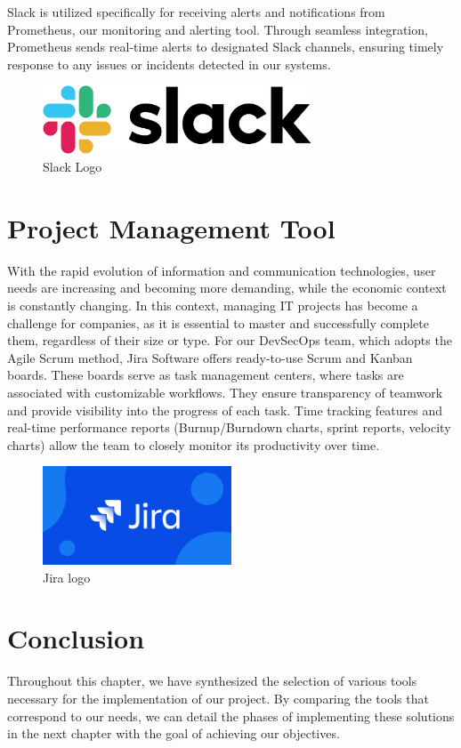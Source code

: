 Slack is utilized specifically for receiving alerts and notifications from Prometheus, our monitoring and alerting tool. Through seamless integration, Prometheus sends real-time alerts to designated Slack channels, ensuring timely response to any issues or incidents detected in our systems.
\begin{figure}[H]
\centering
\includegraphics[width=8cm]{Logos/slack_logo.png}
\caption{Slack Logo}
\end{figure}


\section{Project Management Tool}

With the rapid evolution of information and communication technologies, user needs are increasing and becoming more demanding, while the economic context is constantly changing. In this context, managing IT projects has become a challenge for companies, as it is essential to master and successfully complete them, regardless of their size or type. For our DevSecOps team, which adopts the Agile Scrum method, Jira Software offers ready-to-use Scrum and Kanban boards. These boards serve as task management centers, where tasks are associated with customizable workflows. They ensure transparency of teamwork and provide visibility into the progress of each task. Time tracking features and real-time performance reports (Burnup/Burndown charts, sprint reports, velocity charts) allow the team to closely monitor its productivity over time.

\begin{figure}[h]
    \centering
    \includegraphics[width=0.5\textwidth]{Logos/jira-png.png}
    \caption{Jira logo}
\end{figure}


\section{Conclusion}

Throughout this chapter, we have synthesized the selection of various tools necessary for the implementation of our project. By comparing the tools that correspond to our needs, we can detail the phases of implementing these solutions in the next chapter with the goal of achieving our objectives.

\pagebreak